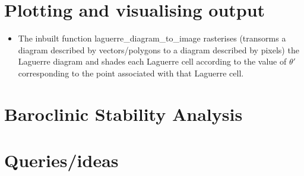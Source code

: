 \documentclass[]{article}
\begin{document}
 	\section{Plotting and visualising output}
 	\begin{itemize}
 		\item The inbuilt function laguerre\_diagram\_to\_image rasterises (transorms a diagram described by vectors/polygons to a diagram described by pixels) the Laguerre diagram and shades each Laguerre cell according to the value of $\theta '$ corresponding to the point associated with that Laguerre cell. 
 	\end{itemize}
 	\section{Baroclinic Stability Analysis}
	\section{Queries/ideas}
\newpage


\end{document}
